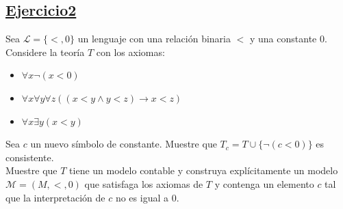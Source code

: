 \subsection*{\uline{Ejercicio2}}
Sea $\mathcal{L} = \{ <, 0 \}$ un lenguaje con una relación binaria $<$ y una constante $0$. Considere la teoría $T$ con los axiomas:
    \begin{itemize}
        \item $\forall x \neg(x < 0)$
        \item $\forall x \forall y \forall z ((x < y \wedge y < z) \rightarrow x < z)$
        \item $\forall x \exists y (x < y)$
    \end{itemize}
    Sea $c$ un nuevo símbolo de constante. Muestre que $T_c = T \cup \{ \neg(c < 0) \}$ es consistente. \\
    Muestre que $T$ tiene un modelo contable y construya explícitamente un modelo $\mathcal{M} = (M, <, 0)$ que satisfaga los axiomas de $T$ y contenga un elemento $c$ tal que la interpretación de $c$ no es igual a $0$.\\

